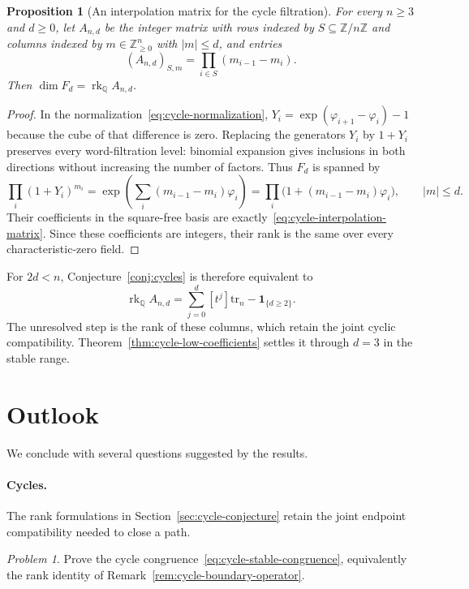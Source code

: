\documentclass[reqno]{article}
\theoremstyle{plain} %
\newtheorem{proposition}[theorem]{Proposition}
\theoremstyle{definition}
\theoremstyle{remark}
\newtheorem{problem}[theorem]{Problem}
\DeclareMathOperator{\rank}{rk}
\newcommand{\Z}{{\mathbb{Z}}}
\numberwithin{equation}{section}
\begin{document}
\begin{proposition}[An interpolation matrix for the cycle filtration]
\label{prop:cycle-interpolation}
For every $n\ge3$ and $d\ge0$, let $A_{n,d}$ be the integer matrix with
rows indexed by $S\subseteq\Z/n\Z$ and columns indexed by
$m\in\Z_{\ge0}^n$ with $|m|\le d$, and entries
\begin{equation}\label{eq:cycle-interpolation-matrix}
 (A_{n,d})_{S,m}=\prod_{i\in S}(m_{i-1}-m_i).
\end{equation}
Then $\dim F_d=\rank_{\mathbb Q}A_{n,d}$.
\end{proposition}
\begin{proof}
In the normalization~\eqref{eq:cycle-normalization},
$Y_i=\exp(\varphi_{i+1}-\varphi_i)-1$ because the cube of that difference
is zero. Replacing the generators $Y_i$ by $1+Y_i$ preserves every
word-filtration level: binomial expansion gives inclusions in both
directions without increasing the number of factors. Thus $F_d$ is
spanned by
\[
 \prod_i(1+Y_i)^{m_i} =\exp\!\left(\sum_i(m_{i-1}-m_i)\varphi_i\right)
 =\prod_i\bigl(1+(m_{i-1}-m_i)\varphi_i\bigr),\qquad |m|\le d.
\]
Their coefficients in the square-free basis are exactly~\eqref{eq:cycle-interpolation-matrix}.
Since these coefficients are integers, their rank is the same over every characteristic-zero field.
\end{proof}

For $2d<n$, Conjecture~\ref{conj:cycles} is therefore equivalent to
\[
 \rank_{\mathbb Q}A_{n,d}
 =\sum_{j=0}^d[t^j]\mathrm{tr}_n-\mathbf1_{\{d\ge2\}}.
\]
The unresolved step is the rank of these columns, which retain the
joint cyclic compatibility. Theorem~\ref{thm:cycle-low-coefficients}
settles it through $d=3$ in the stable range.

\section{Outlook}
\label{sec:outlook}

We conclude with several questions suggested by the results.

\paragraph{Cycles.}
The rank formulations in Section~\ref{sec:cycle-conjecture} retain the
joint endpoint compatibility needed to close a path.
\begin{problem}\label{prob:cycles}
Prove the cycle congruence~\eqref{eq:cycle-stable-congruence},
equivalently the rank identity of
Remark~\ref{rem:cycle-boundary-operator}.
\end{problem}
\end{document}
